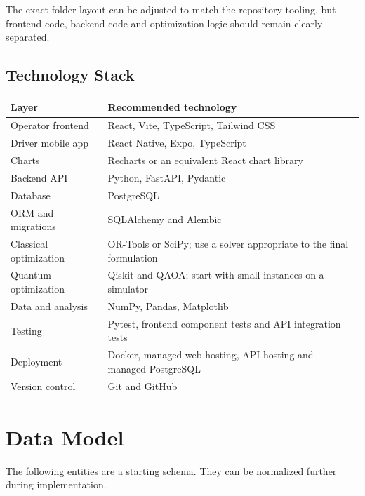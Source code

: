\documentclass[11pt,a4paper]{article}
\begin{document}
The exact folder layout can be adjusted to match the repository tooling, but frontend code, backend code and optimization logic should remain clearly separated.

\subsection{Technology Stack}

\begin{tabularx}{\textwidth}{p{3.1cm}X}
\toprule
\textbf{Layer} & \textbf{Recommended technology} \\
\midrule
Operator frontend & React, Vite, TypeScript, Tailwind CSS \\
Driver mobile app & React Native, Expo, TypeScript \\
Charts & Recharts or an equivalent React chart library \\
Backend API & Python, FastAPI, Pydantic \\
Database & PostgreSQL \\
ORM and migrations & SQLAlchemy and Alembic \\
Classical optimization & OR-Tools or SciPy; use a solver appropriate to the final formulation \\
Quantum optimization & Qiskit and QAOA; start with small instances on a simulator \\
Data and analysis & NumPy, Pandas, Matplotlib \\
Testing & Pytest, frontend component tests and API integration tests \\
Deployment & Docker, managed web hosting, API hosting and managed PostgreSQL \\
Version control & Git and GitHub \\
\bottomrule
\end{tabularx}

\section{Data Model}

The following entities are a starting schema. They can be normalized further during implementation.
\end{document}
